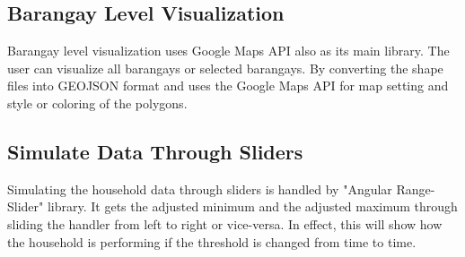 \subsection{Barangay Level Visualization}
Barangay level visualization uses Google Maps API also as its main library. The user can visualize all barangays or selected barangays. By converting the shape files into GEOJSON format and uses the Google Maps API for map setting and style or coloring of the polygons. 

\subsection{Simulate Data Through Sliders}
Simulating the household data through sliders is handled by "Angular Range-Slider" library. It gets the adjusted minimum and the adjusted maximum through sliding the handler from left to right or vice-versa. In effect, this will show how the household is performing if the threshold is changed from time to time.

\clearpage